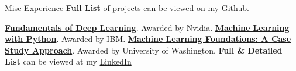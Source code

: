 \begin{rubric}{Misc Experience}
\entry*[More] \textbf{Full List} of projects can be viewed on my \href{https://github.com/nkapila6}{Github}.


\entry*[2024] \textbf{\href{https://learn.nvidia.com/certificates?id=0x3zAbT6TfilxUwD_kMgaA}{Fundamentals of Deep Learning}}. Awarded by Nvidia.
\entry*[2024] \textbf{\href{https://www.credly.com/badges/88522d33-bcf6-4aca-ae8c-21a58a68a594/print}{Machine Learning with Python}}. Awarded by IBM.
\entry*[2024] \textbf{\href{https://www.coursera.org/account/accomplishments/verify/W6DPNVH4V88P}{Machine Learning Foundations: A Case Study Approach}}. Awarded by University of Washington.
\entry*[Others] \textbf{Full \& Detailed List} can be viewed at my \href{https://www.linkedin.com/in/nikhilkapila/details/certifications/}{LinkedIn}
\end{rubric}